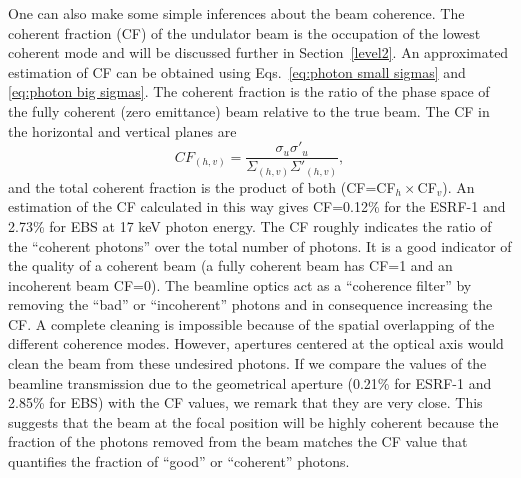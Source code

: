 \documentclass{iucr}              %
\begin{document}
One can also make some simple inferences about the beam coherence. The coherent fraction (CF) \cite{arxivCF} of the undulator beam is the occupation of the lowest coherent mode and will be discussed further in Section~\ref{level2}. An approximated estimation of CF can be obtained using Eqs.~\ref{eq:photon small sigmas} and \ref{eq:photon big sigmas}. The coherent fraction is the ratio of the phase space of the fully coherent (zero emittance) beam relative to the true beam. The CF in the horizontal and vertical planes are
\begin{equation}\label{eq:coherent fraction}
 CF_{(h,v)} = \frac{\sigma_u \sigma'_u}{\Sigma_{(h,v)} \Sigma'_{(h,v)}},
\end{equation}
and the total coherent fraction is the product of both (CF=CF$_h \times $CF$_v$). An estimation of the CF calculated in this way gives CF=0.12\% for the ESRF-1 and 2.73\% for EBS at 17 keV photon energy. The CF roughly indicates the ratio of the ``coherent photons'' over the total number of photons. It is a good indicator of the quality of a coherent beam (a fully coherent beam has CF=1 and an incoherent beam CF=0). The beamline optics act as a ``coherence filter'' by removing the ``bad'' or ``incoherent'' photons and in consequence increasing the CF. A complete cleaning is impossible because of the spatial overlapping of the different coherence modes. However, apertures centered at the optical axis would clean the beam from these undesired photons. If we compare the values of the beamline transmission due to the geometrical aperture  (0.21\% for ESRF-1 and 2.85\% for EBS) with the CF values, we remark that they are very close. This suggests that the beam at the focal position will be highly coherent because the fraction of the photons removed from the beam matches the CF value that quantifies the fraction of ``good'' or ``coherent'' photons. 
\end{document}
